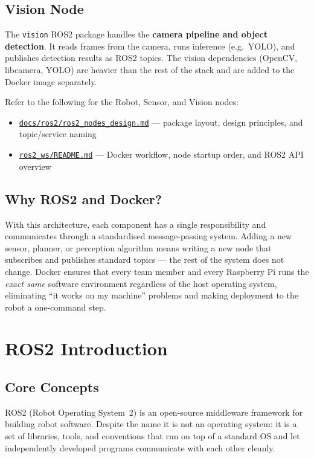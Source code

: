 \documentclass{ol-softwaremanual}
\newcommand{\doclink}[2]{\href{#1}{#2}}
\begin{document}
\subsection*{Vision Node}
The \texttt{vision} ROS2 package handles the \textbf{camera pipeline and object detection}.
It reads frames from the camera, runs inference (e.g.\ YOLO), and publishes detection results
as ROS2 topics.
The vision dependencies (OpenCV, libcamera, YOLO) are heavier than the rest of the stack
and are added to the Docker image separately.

Refer to the following for the Robot, Sensor, and Vision nodes:
\begin{itemize}
  \item \doclink{https://github.com/pochihh/Project-NUEVO/blob/main/docs/ros2/ros2_nodes_design.md}{\texttt{docs/ros2/ros2\_nodes\_design.md}} --- package layout, design principles, and topic/service naming
  \item \doclink{https://github.com/pochihh/Project-NUEVO/blob/main/ros2_ws/README.md}{\texttt{ros2\_ws/README.md}} --- Docker workflow, node startup order, and ROS2 API overview
\end{itemize}

\subsection*{Why ROS2 and Docker?}
With this architecture, each component has a single responsibility and communicates
through a standardised message-passing system.
Adding a new sensor, planner, or perception algorithm means writing a new node
that subscribes and publishes standard topics --- the rest of the system does not change.
Docker ensures that every team member and every Raspberry Pi runs the \emph{exact same}
software environment regardless of the host operating system, eliminating
``it works on my machine'' problems and making deployment to the robot a one-command step.


\section{ROS2 Introduction}

\subsection{Core Concepts}

ROS2 (Robot Operating System~2) is an open-source middleware framework for building
robot software.
Despite the name it is not an operating system: it is a set of libraries, tools, and
conventions that run on top of a standard OS and let independently developed programs
communicate with each other cleanly.
\end{document}
